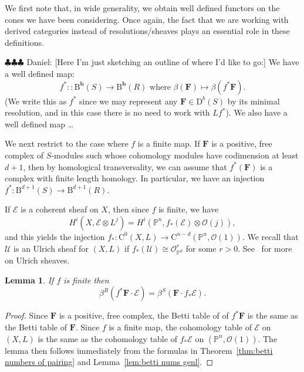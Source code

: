 \documentclass[12pt]{amsart}
\newtheorem{lemma}{Lemma}[section]
\theoremstyle{definition}
\theoremstyle{remark}
\newcommand{\Spec}{\operatorname{Spec}}
\newcommand{\kk}{\Bbbk}
\newcommand{\PP}{\mathbb{P}}
\renewcommand{\AA}{\mathbb{A}}
\newcommand{\GG}{\mathbb{G}}
\newcommand{\bb}{\mathbf{b}}
\newcommand{\cO}{\mathcal{O}}
\newcommand{\cE}{\mathcal{E}}
\newcommand{\cU}{\mathcal{U}}
\newcommand{\FF}{\mathbf{F}}
\newcommand{\DD}{\mathrm{D}}
\newcommand{\CQ}{\mathrm{C}}
\newcommand{\BBQ}{\mathrm{B}}
\newcommand{\daniel}[1]{{\color{green} \sf $\clubsuit\clubsuit\clubsuit$ Daniel: [#1]}}
\begin{document}
We first note that, in wide generality, we obtain well defined functors on the cones we have been considering.  Once again, the fact that we are working with derived categories instead of resolutions/sheaves plays an essential role in these definitions.

\daniel{Here I'm just sketching an outline of where I'd like to go:}
We have a well defined map:
\[
f^*\colon: \BBQ^{\bb}(S)\to \BBQ^{\bb}(R) \text{ where } \beta(\FF) \mapsto \beta(f^*\FF).
\]
(We write this as $f^*$ since we may represent any $\FF\in \DD^b(S)$ by its minimal resolution, and in this case there is no need to work with $Lf^*$).
We also have a well defined map \dots




We next restrict to the case where $f$ is a finite map. If $\FF$ is a positive, free complex of $S$-modules such whose cohomology modules have codimension at least $d+1$, then by homological transversality, we can assume that $f^*(\FF)$ is a complex with finite length homology.  In particular, we have an injection $f^*\colon \BBQ^{d+1}(S)\to \BBQ^{d+1}(R)$.

If $\cE$ is a coherent sheaf on $X$, then since $f$ is finite, we have
\[
H^i(X,\cE\otimes L^j)=H^i(\PP^n, f_*(\cE)\otimes \cO(j)),
\]
and this yields the injection $f_*\colon \CQ^0(X,L)\to \CQ^{n-d}(\PP^n,\cO(1))$.
We recall that $\cU$ is an Ulrich sheaf for $(X,L)$ if $f_*(\cU)\cong \cO_{\PP^d}^r$ for some $r>0$.  See~\cite{XXXX} for more on Ulrich sheaves.

\begin{lemma}\label{lem:general pairing}
If $f$ is finite then
\[
\beta^R(f^*\FF\cdot \cE)=\beta^S(\FF\cdot f_*\cE).
\]
\end{lemma}
\begin{proof}
Since $\FF$ is a positive, free complex, the Betti table of of $f^*\FF$ is the same as the Betti table of $\FF$.  Since $f$ is a finite map, the cohomology table of $\cE$ on $(X,L)$ is the same as the cohomology table of $f_*\cE$ on $(\PP^n, \cO(1))$.  The lemma then follows immediately from the formulas in Theorem~\ref{thm:betti numbers of pairing} and Lemma~\ref{lem:betti nums genl}.
\end{proof}
\end{document}
